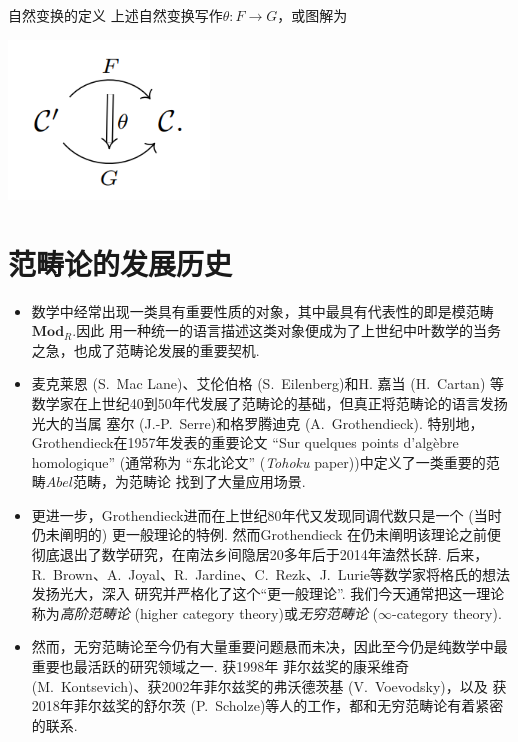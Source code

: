 \documentclass{beamer}
\newcommand\Mod[1]{\mathbf{Mod}_{#1}}
\begin{document}
	\begin{frame}{自然变换的定义}
		上述自然变换写作$\theta: F\rightarrow G$，或图解为
		\begin{center}
			\includegraphics[width=0.4\textwidth]{pic/figure3.png} 
		\end{center}
	\end{frame}
	
	\section{范畴论的发展历史}
	\begin{frame}
		\begin{itemize}[<+->]
			\item 数学中经常出现一类具有重要性质的对象，其中最具有代表性的即是模范畴$\Mod{R}$.因此
			用一种统一的语言描述这类对象便成为了上世纪中叶数学的当务之急，也成了范畴论发展的重要契机.
			
			\item 麦克莱恩 (S.~Mac Lane)、艾伦伯格 (S.~Eilenberg)和H. 嘉当 (H.~Cartan)
			等数学家在上世纪40到50年代发展了范畴论的基础，但真正将范畴论的语言发扬光大的当属
			塞尔 (J.-P.~Serre)和格罗腾迪克 (A.~Grothendieck). 特别地，Grothendieck在1957年发表的重要论文
			``Sur quelques points d'algèbre homologique'' (通常称为
			``东北论文'' (\textit{Tohoku} paper))中定义了一类重要的范畴$Abel$范畴，为范畴论
			找到了大量应用场景.
		\end{itemize}
		
	\end{frame}
	
	\begin{frame}
		\begin{itemize}[<+->]
			\item 更进一步，Grothendieck进而在上世纪80年代又发现同调代数只是一个 (当时仍未阐明的) 更一般理论的特例. 然而Grothendieck
			在仍未阐明该理论之前便彻底退出了数学研究，在南法乡间隐居20多年后于2014年溘然长辞. 
			后来，R.~Brown、A.~Joyal、R.~Jardine、C.~Rezk、J.~Lurie等数学家将格氏的想法发扬光大，深入
			研究并严格化了这个``更一般理论''. 我们今天通常把这一理论
			称为\textit{高阶范畴论} (higher category theory)或\textit{无穷范畴论} ($\infty$-category theory).
			
			\item 然而，无穷范畴论至今仍有大量重要问题悬而未决，因此至今仍是纯数学中最重要也最活跃的研究领域之一. 获1998年
			菲尔兹奖的康采维奇 (M.~Kontsevich)、获2002年菲尔兹奖的弗沃德茨基 (V.~Voevodsky)，以及
			获2018年菲尔兹奖的舒尔茨 (P.~Scholze)等人的工作，都和无穷范畴论有着紧密的联系.
		\end{itemize}
	\end{frame}
\end{document}
